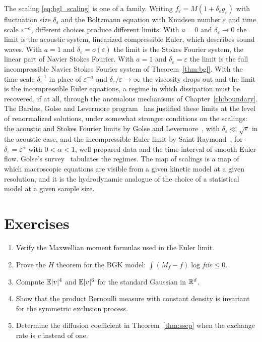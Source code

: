 The scaling \eqref{eq:bgl_scaling} is one of a family. Writing $f_\varepsilon = M(1+\delta_\varepsilon g_\varepsilon)$ with fluctuation size $\delta_\varepsilon$ and the Boltzmann equation with Knudsen number $\varepsilon$ and time scale $\varepsilon^{-a}$, different choices produce different limits. With $a = 0$ and $\delta_\varepsilon\to0$ the limit is the acoustic system, linearized compressible Euler, which describes sound waves. With $a = 1$ and $\delta_\varepsilon = o(\varepsilon)$ the limit is the Stokes Fourier system, the linear part of Navier Stokes Fourier. With $a = 1$ and $\delta_\varepsilon = \varepsilon$ the limit is the full incompressible Navier Stokes Fourier system of Theorem~\ref{thm:bgl}. With the time scale $\delta_\varepsilon^{-1}$ in place of $\varepsilon^{-a}$ and $\delta_\varepsilon/\varepsilon\to\infty$ the viscosity drops out and the limit is the incompressible Euler equations, a regime in which dissipation must be recovered, if at all, through the anomalous mechanisms of Chapter~\ref{ch:boundary}. The Bardos, Golse and Levermore program~\cite{bgl1991,bgl1993} has justified these limits at the level of renormalized solutions, under somewhat stronger conditions on the scalings: the acoustic and Stokes Fourier limits by Golse and Levermore~\cite{golselevermore2002}, with $\delta_\varepsilon\ll\sqrt\varepsilon$ in the acoustic case, and the incompressible Euler limit by Saint Raymond~\cite{saintraymond2003}, for $\delta_\varepsilon = \varepsilon^\alpha$ with $0<\alpha<1$, well prepared data and the time interval of smooth Euler flow. Golse's survey~\cite{golse2011} tabulates the regimes. The map of scalings is a map of which macroscopic equations are visible from a given kinetic model at a given resolution, and it is the hydrodynamic analogue of the choice of a statistical model at a given sample size.

\section*{Exercises}
\begin{enumerate}
\item Verify the Maxwellian moment formulas used in the Euler limit.
\item Prove the $H$ theorem for the BGK model: $\int(M_f-f)\log f\dd v\leq0$.
\item Compute $\mathbb{E}|v|^4$ and $\mathbb{E}|v|^6$ for the standard Gaussian in $\mathbb{R}^d$.
\item Show that the product Bernoulli measure with constant density is invariant for the symmetric exclusion process.
\item Determine the diffusion coefficient in Theorem~\ref{thm:ssep} when the exchange rate is $c$ instead of one.
\end{enumerate}

